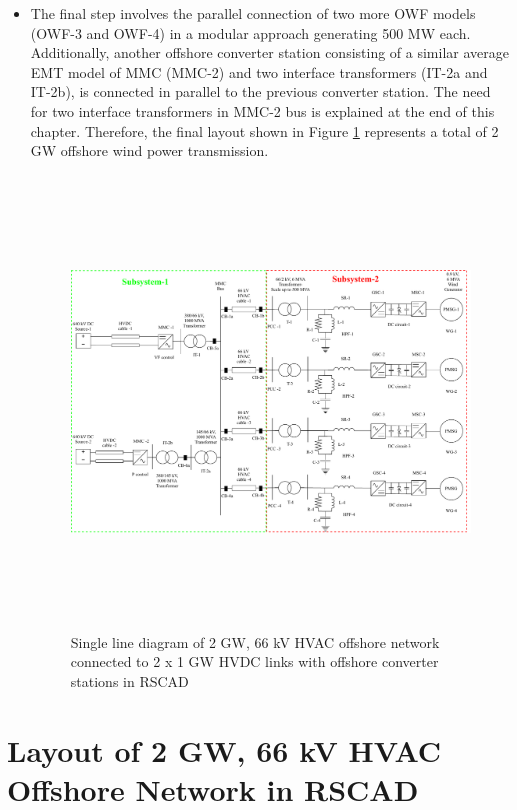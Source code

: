 \begin{itemize}
    \item The final step involves the parallel connection of two more \gls{OWF} models (\gls{OWF}-3 and \gls{OWF}-4) in a modular approach generating 500 MW each. Additionally, another offshore converter station consisting of a similar average \gls{EMT} model of \gls{MMC} (\gls{MMC}-2) and two interface transformers (IT-2a and IT-2b), is connected in parallel to the previous converter station. The need for two interface transformers in \gls{MMC}-2 bus is explained at the end of this chapter. Therefore, the final layout shown in Figure \ref{fig:WT4_MMC2} represents a total of 2 GW offshore wind power transmission.

\begin{figure}[H]
    \includegraphics[height = 12cm,width = \textwidth]{Diagrams/Chapter_4/WT4_MMC2_new.pdf}
    \caption{Single line diagram of 2 GW, 66 kV HVAC offshore network connected to 2 x 1 GW HVDC links with offshore converter stations in RSCAD}
    \label{fig:WT4_MMC2}
\end{figure}

\end{itemize}

\section{Layout of 2 GW, 66 kV HVAC Offshore Network in RSCAD}

